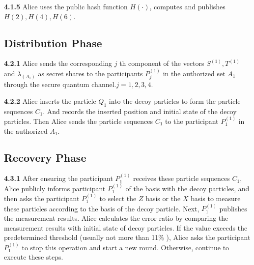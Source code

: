 \documentclass[pdflatex,sn-mathphys]{sn-jnl}%
\theoremstyle{thmstyleone}%
\theoremstyle{thmstyletwo}%
\theoremstyle{thmstylethree}%
\begin{document}
\indent\textbf{4.1.5} Alice uses the public hash function $H(\cdot)$, computes and publishes $H(2),H(4),H(6)$.

\subsection{Distribution Phase}\label{subsec2}

\textbf{4.2.1} Alice sends the corresponding $j$ th component of the vectors $S^{(1)},T^{(1)}$ and $\lambda_{(A_1)}$ as secret shares to the participants $P_j^{(1)}$ in the authorized set $A_1$ through the secure quantum channel.$j=1,2,3,4$.

\indent\textbf{4.2.2} Alice inserts the particle $Q_1$ into the decoy particles to form the particle sequences $C_1$. And records the inserted position and initial state of the decoy particles. Then Alice sends the particle sequences $C_1$ to the participant $P_1^{(1)}$ in the authorized $A_1$.

\subsection{Recovery Phase}\label{subsec3}

\textbf{4.3.1} After ensuring the participant $P_1^{(1)}$ receives these particle sequences $C_1$, Alice publicly informs participant $P_1^{(1)}$ of the basis with the decoy particles, and then asks the participant $P_1^{(1)}$ to select the $Z$ basis or the $X$ basis to measure these particles according to the basis of the decoy particle. Next, $P_1^{(1)}$ publishes the measurement results. Alice calculates the error ratio by comparing the measurement results with initial state of decoy particles. If the value exceeds the predetermined threshold (usually not more than 11\% \cite{ref-ur34}), Alice asks the participant $P_1^{(1)}$ to stop this operation and start a new round. Otherwise, continue to execute these steps. 
\end{document}
